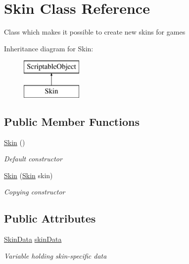 \hypertarget{class_skin}{}\section{Skin Class Reference}
\label{class_skin}


Class which makes it possible to create new skins for games  


Inheritance diagram for Skin\+:\begin{figure}[H]
\begin{center}
\leavevmode
\includegraphics[height=2.000000cm]{class_skin}
\end{center}
\end{figure}
\subsection*{Public Member Functions}
\begin{DoxyCompactItemize}
\item 
\mbox{\hyperlink{class_skin_a86f78acdf98d955dfc0f12f9789ae063}{Skin}} ()
\begin{DoxyCompactList}\small\item\em Default constructor \end{DoxyCompactList}\item 
\mbox{\hyperlink{class_skin_a8d2828252e54b57fc361b9eefceb6574}{Skin}} (\mbox{\hyperlink{class_skin}{Skin}} skin)
\begin{DoxyCompactList}\small\item\em Copying constructor \end{DoxyCompactList}\end{DoxyCompactItemize}
\subsection*{Public Attributes}
\begin{DoxyCompactItemize}
\item 
\mbox{\hyperlink{class_skin_data}{Skin\+Data}} \mbox{\hyperlink{class_skin_aca692cdd02d768e2e8b1c05461e11172}{skin\+Data}}
\begin{DoxyCompactList}\small\item\em Variable holding skin-\/specific data \end{DoxyCompactList}\end{DoxyCompactItemize}


